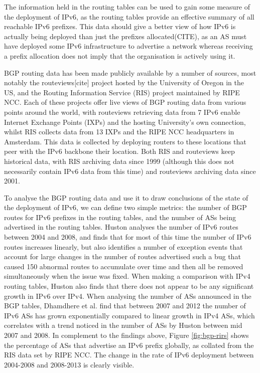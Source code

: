 The information held in the routing tables can be used to gain some measure of
the deployment of IPv6, as the routing tables provide an effective summary of
all reachable IPv6 prefixes. This data should give a better view of how IPv6 is
actually being deployed than just the prefixes allocated(CITE), as an AS must
have deployed some IPv6 infrastructure to advertise a network whereas receiving
a prefix allocation does not imply that the organisation is actively using it.

BGP routing data has been made publicly available by a number of sources, most
notably the routeviews[cite] project hosted by the University of Oregon in the
US, and the Routing Information Service (RIS) project maintained by RIPE NCC.
Each of these projects offer live views of BGP routing data from various points
around the world, with routeviews retrieving data from 7 IPv6 enable Internet
Exchange Points (IXPs) and the hosting University's own connection, whilst RIS
collects data from 13 IXPs and the RIPE NCC headquarters in Amsterdam. This data
is collected by deploying routers to these locations that peer with the IPv6
backbone their location. Both RIS and routeviews keep historical data, with RIS
archiving data since 1999 (although this does not necessarily contain IPv6 data
from this time) and routeviews archiving data since 2001. 

To analyse the BGP routing data and use it to draw conclusions of the state of
the deployment of IPv6, we can define two simple metrics: the number of BGP
routes for IPv6 prefixes in the routing tables, and the number of ASs being
advertised in the routing tables. Huston analyses the number of IPv6 routes
between 2004 and 2008, and finds that for most of this time the number of IPv6
routes increases linearly, but also identifies a number of exception events that
account for large changes in the number of routes advertised such a bug that
caused 150 abnormal routes to accumulate over time and then all be removed
simultaneously when the issue was fixed. When making a comparison with IPv4
routing tables, Huston also finds that there does not appear to be any
significant growth in IPv6 over IPv4. When analysing the number of ASs announced
in the BGP tables, Dhamdhere et al. find that between 2007 and 2012 the number
of IPv6 ASs has grown exponentially compared to linear growth in IPv4 ASs, which
correlates with a trend noticed in the number of ASs by Huston between mid 2007
and 2008. In complement to the findings above, Figure \ref{fig:bgp-rirs} shows the percentage
of ASs that advertise an IPv6 prefix globally, as collated from the RIS data set
by RIPE NCC. The change in the rate of IPv6 deployment between 2004-2008 and
2008-2013 is clearly visible.

